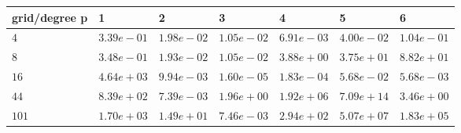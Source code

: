 \begin{tabular}{lllllll}
\hline
 grid/degree p   & 1          & 2          & 3          & 4          & 5          & 6          \\
\hline
 $4$             & $3.39e-01$ & $1.98e-02$ & $1.05e-02$ & $6.91e-03$ & $4.00e-02$ & $1.04e-01$ \\
 $8$             & $3.48e-01$ & $1.93e-02$ & $1.05e-02$ & $3.88e+00$ & $3.75e+01$ & $8.82e+01$ \\
 $16$            & $4.64e+03$ & $9.94e-03$ & $1.60e-05$ & $1.83e-04$ & $5.68e-02$ & $5.68e-03$ \\
 $44$            & $8.39e+02$ & $7.39e-03$ & $1.96e+00$ & $1.92e+06$ & $7.09e+14$ & $3.46e+00$ \\
 $101$           & $1.70e+03$ & $1.49e+01$ & $7.46e-03$ & $2.94e+02$ & $5.07e+07$ & $1.83e+05$ \\
\hline
\end{tabular}
